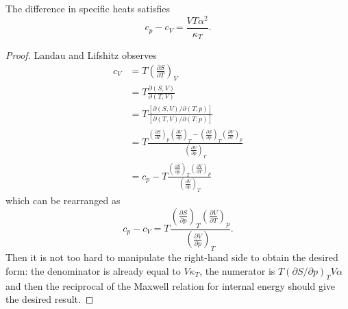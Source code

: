 \begin{proposition}
The difference in specific heats satisfies
\begin{equation}
c_{p}-c_{V} = \frac{VT\alpha^{2}}{\kappa_{T}}.
\end{equation}
\end{proposition}

\begin{proof}
Landau and Lifshitz observes
\begin{subequations}
  \begin{align}
c_{V} &= T\left(\frac{\partial S}{\partial T}\right)_{V}\\
&= T \frac{\partial(S,V)}{\partial(T,V)}\\
&= T \frac{[\partial(S,V)/\partial(T,p)]}{[\partial(T,V)/\partial(T,p)]}\\
&= T \frac{\left(\frac{\partial S}{\partial T}\right)_{p}\left(\frac{\partial V}{\partial p}\right)_{T}-\left(\frac{\partial S}{\partial p}\right)_{T}\left(\frac{\partial V}{\partial T}\right)_{p}}{\left(\frac{\partial V}{\partial p}\right)_{T}}\\
&= c_{p} - T \frac{\left(\frac{\partial S}{\partial p}\right)_{T}\left(\frac{\partial V}{\partial T}\right)_{p}}{\left(\frac{\partial V}{\partial p}\right)_{T}}
  \end{align}
\end{subequations}
which can be rearranged as
\begin{equation}
c_{p}-c_{V} = T \frac{\left(\frac{\partial S}{\partial p}\right)_{T}\left(\frac{\partial V}{\partial T}\right)_{p}}{\left(\frac{\partial V}{\partial p}\right)_{T}}.
\end{equation}
Then it is not too hard to manipulate the right-hand side to obtain
the desired form: the denominator is already equal to $V\kappa_{T}$,
the numerator is $T(\partial S/\partial p)_{T}V\alpha$ and then the
reciprocal of the Maxwell relation for internal energy should give the
desired result.
\end{proof}